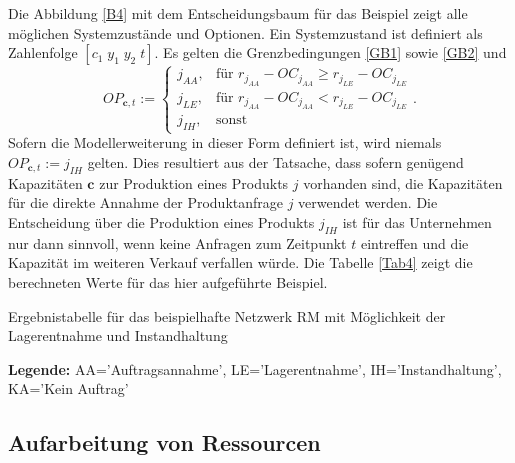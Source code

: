 Die Abbildung \ref{B4} mit dem Entscheidungsbaum für das Beispiel zeigt alle möglichen Systemzustände und Optionen. Ein Systemzustand ist definiert als Zahlenfolge $[c_{1}\; y_{1}\; y_{2}\;t]$. Es gelten die Grenzbedingungen \eqref{GB1} sowie \eqref{GB2} und
\begin{equation}\label{GB4}
     OP_{\textbf{c}, t}:=\left\{\begin{array}{lll} j_{AA}, & \text{für } r_{j_{AA}} - OC_{j_{AA}} \ge r_{j_{LE}} - OC_{j_{LE}}\\
         j_{LE}, & \text{für } r_{j_{AA}} - OC_{j_{AA}} < r_{j_{LE}} - OC_{j_{LE}}\\
         j_{IH}, & \text{sonst}\end{array}\right. .
\end{equation}
Sofern die Modellerweiterung in dieser Form definiert ist, wird niemals $OP_{\textbf{c}, t}:=j_{IH}$ gelten. Dies resultiert aus der Tatsache, dass sofern genügend Kapazitäten $\textbf{c}$ zur Produktion eines Produkts $j$ vorhanden sind, die Kapazitäten für die direkte Annahme der Produktanfrage $j$ verwendet werden. Die Entscheidung über die Produktion eines Produkts $j_{IH}$ ist für das Unternehmen nur dann sinnvoll, wenn keine Anfragen zum Zeitpunkt $t$ eintreffen und die Kapazität im weiteren Verkauf verfallen würde. Die Tabelle \ref{Tab4} zeigt die berechneten Werte für das hier aufgeführte Beispiel.
\begin{table}
\begin{footnotesize}
    \caption{Ergebnistabelle für das beispielhafte Netzwerk RM mit Möglichkeit der Lagerentnahme und Instandhaltung} \label{Tab4}
    \vspace*{3mm}
    \begin{center}
      \end{center}
    \begin{center}
      {\footnotesize \textbf{Legende:} AA='Auftragsannahme', LE='Lagerentnahme', IH='Instandhaltung', KA='Kein Auftrag'} 
      \end{center}
\end{footnotesize}
\end{table}

\subsection{Aufarbeitung von Ressourcen}

